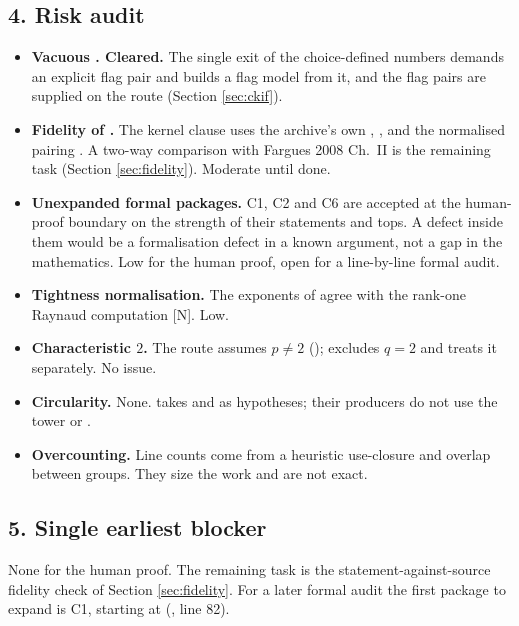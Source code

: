 \documentclass[11pt]{article}
\newcommand{\mN}{\textsf{[N]}}
\theoremstyle{remark}
\begin{document}
\subsection*{4. Risk audit}
\begin{itemize}[nosep]
\item \textbf{Vacuous . Cleared.} The single exit of the choice-defined numbers demands an explicit flag pair and builds a flag model from it, and the flag pairs are supplied on the route (Section \ref{sec:ckif}).
\item \textbf{Fidelity of .} The kernel clause uses the archive's own , ,  and the normalised pairing . A two-way comparison with Fargues 2008 Ch.\ II is the remaining task (Section \ref{sec:fidelity}). Moderate until done.
\item \textbf{Unexpanded formal packages.} C1, C2 and C6 are accepted at the human-proof boundary on the strength of their statements and tops. A defect inside them would be a formalisation defect in a known argument, not a gap in the mathematics. Low for the human proof, open for a line-by-line formal audit.
\item \textbf{Tightness normalisation.} The exponents of  agree with the rank-one Raynaud computation \mN. Low.
\item \textbf{Characteristic $2$.} The route assumes $p\neq2$ ();  excludes $q=2$ and  treats it separately. No issue.
\item \textbf{Circularity.} None.  takes  and  as hypotheses; their producers do not use the tower or .
\item \textbf{Overcounting.} Line counts come from a heuristic use-closure and overlap between groups. They size the work and are not exact.
\end{itemize}

\subsection*{5. Single earliest blocker}
None for the human proof. The remaining task is the statement-against-source fidelity check of Section \ref{sec:fidelity}. For a later formal audit the first package to expand is C1, starting at  (, line 82).
\end{document}
